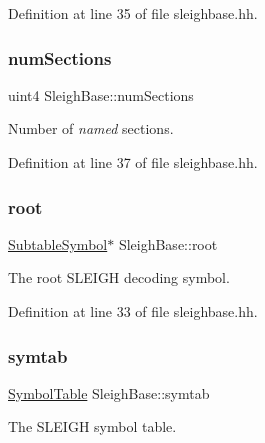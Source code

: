 Definition at line 35 of file sleighbase.\+hh.

\mbox{\label{class_sleigh_base_ad2fa79db86516492f21ed6d826e7b2c4}} 
\subsubsection{\texorpdfstring{numSections}{numSections}}
{\footnotesize\ttfamily uint4 Sleigh\+Base\+::num\+Sections\hspace{0.3cm}{\ttfamily [protected]}}



Number of {\itshape named} sections. 



Definition at line 37 of file sleighbase.\+hh.

\mbox{\label{class_sleigh_base_a63699520bf1186106cf8200718b51039}} 
\subsubsection{\texorpdfstring{root}{root}}
{\footnotesize\ttfamily \mbox{\hyperlink{class_subtable_symbol}{Subtable\+Symbol}}$\ast$ Sleigh\+Base\+::root\hspace{0.3cm}{\ttfamily [protected]}}



The root S\+L\+E\+I\+GH decoding symbol. 



Definition at line 33 of file sleighbase.\+hh.

\mbox{\label{class_sleigh_base_ab7bf39a81c8133d7b21d491257b2627d}} 
\subsubsection{\texorpdfstring{symtab}{symtab}}
{\footnotesize\ttfamily \mbox{\hyperlink{class_symbol_table}{Symbol\+Table}} Sleigh\+Base\+::symtab\hspace{0.3cm}{\ttfamily [protected]}}



The S\+L\+E\+I\+GH symbol table. 



